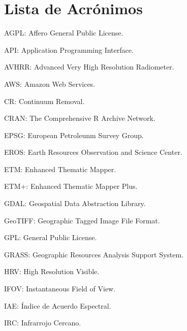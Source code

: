 


\chapter*{Lista de Acrónimos}

AGPL: Affero General Public License.

API: Application Programming Interface.

AVHRR: Advanced Very High Resolution Radiometer.

AWS: Amazon Web Services.

CR: Continuum Removal.

CRAN: The Comprehensive R Archive Network.

EPSG: European Petroleunm Survey Group.

EROS: Earth Resources Observation and Science Center.

ETM: Enhanced Thematic Mapper.

ETM+: Enhanced Thematic Mapper Plus.

GDAL: Geospatial Data Abstraction Library.

GeoTIFF: Geographic Tagged Image File Format.

GPL: General Public License.

GRASS: Geographic Resources Analysis Support System.

HRV: High Resolution Visible.

IFOV: Instantaneous Field of View.

IAE: Índice de Acuerdo Espectral.

IRC: Infrarrojo Cercano.

